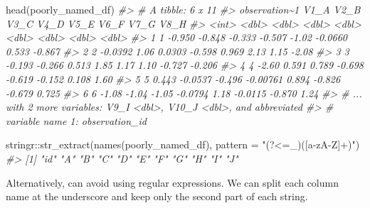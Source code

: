 \documentclass[
  12pt,
]{book}
\newenvironment{Shaded}{\begin{snugshade}}{\end{snugshade}}
\newcommand{\AttributeTok}[1]{\textcolor[rgb]{0.77,0.63,0.00}{#1}}
\newcommand{\CommentTok}[1]{\textcolor[rgb]{0.56,0.35,0.01}{\textit{#1}}}
\newcommand{\FunctionTok}[1]{\textcolor[rgb]{0.00,0.00,0.00}{#1}}
\newcommand{\NormalTok}[1]{#1}
\newcommand{\SpecialCharTok}[1]{\textcolor[rgb]{0.00,0.00,0.00}{#1}}
\newcommand{\StringTok}[1]{\textcolor[rgb]{0.31,0.60,0.02}{#1}}
\begin{document}
\begin{Shaded}
\begin{Highlighting}[]
\FunctionTok{head}\NormalTok{(poorly\_named\_df)}
\CommentTok{\#\textgreater{} \# A tibble: 6 x 11}
\CommentTok{\#\textgreater{}   observation\textasciitilde{}1    V1\_A    V2\_B    V3\_C     V4\_D   V5\_E    V6\_F   V7\_G   V8\_H}
\CommentTok{\#\textgreater{}           \textless{}int\textgreater{}   \textless{}dbl\textgreater{}   \textless{}dbl\textgreater{}   \textless{}dbl\textgreater{}    \textless{}dbl\textgreater{}  \textless{}dbl\textgreater{}   \textless{}dbl\textgreater{}  \textless{}dbl\textgreater{}  \textless{}dbl\textgreater{}}
\CommentTok{\#\textgreater{} 1             1 {-}0.950  {-}0.848  {-}0.333  {-}0.507   {-}1.02  {-}0.0660  0.533 {-}0.867}
\CommentTok{\#\textgreater{} 2             2 {-}0.0392  1.06    0.0303 {-}0.598    0.969  2.13    1.15  {-}2.08 }
\CommentTok{\#\textgreater{} 3             3 {-}0.193  {-}0.266   0.513   1.85     1.17   1.10   {-}0.727 {-}0.206}
\CommentTok{\#\textgreater{} 4             4 {-}2.60    0.591   0.789  {-}0.698   {-}0.619 {-}0.152   0.108  1.60 }
\CommentTok{\#\textgreater{} 5             5  0.443  {-}0.0537 {-}0.496  {-}0.00761  0.894 {-}0.826  {-}0.679  0.725}
\CommentTok{\#\textgreater{} 6             6 {-}1.08   {-}1.04   {-}1.05   {-}0.0794   1.18  {-}0.0115 {-}0.870  1.24 }
\CommentTok{\#\textgreater{} \# ... with 2 more variables: V9\_I \textless{}dbl\textgreater{}, V10\_J \textless{}dbl\textgreater{}, and abbreviated}
\CommentTok{\#\textgreater{} \#   variable name 1: observation\_id}
\end{Highlighting}
\end{Shaded}

\begin{Shaded}
\begin{Highlighting}[]
\NormalTok{stringr}\SpecialCharTok{::}\FunctionTok{str\_extract}\NormalTok{(}\FunctionTok{names}\NormalTok{(poorly\_named\_df), }\AttributeTok{pattern =} \StringTok{"(?\textless{}=\_)([a{-}zA{-}Z]+)"}\NormalTok{)}
\CommentTok{\#\textgreater{}  [1] "id" "A"  "B"  "C"  "D"  "E"  "F"  "G"  "H"  "I"  "J"}
\end{Highlighting}
\end{Shaded}

Alternatively, can avoid using regular expressions. We can split each column name at the underscore and keep only the second part of each string.
\end{document}
